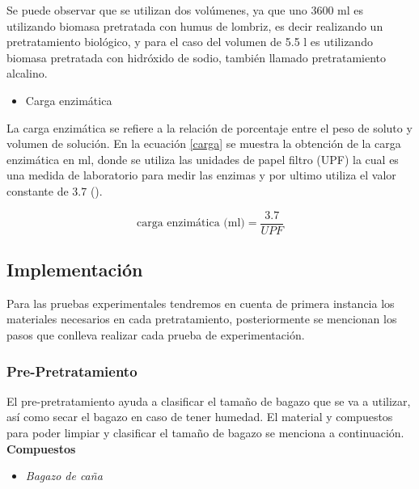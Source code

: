 \documentclass[12pt]{article}
\begin{document}
		
		Se puede observar que se utilizan dos volúmenes, ya que uno 3600 ml es utilizando biomasa pretratada con humus de lombriz, es decir realizando un pretratamiento biológico, y para el caso del volumen de 5.5 l es utilizando biomasa pretratada con hidróxido de sodio, también llamado pretratamiento alcalino.
		
		
			\begin{itemize}
			\item  Carga enzimática
	     	\end{itemize}
		
		
	La carga enzimática se refiere a la relación de porcentaje entre el peso de soluto y volumen de solución. En la ecuación \ref{carga} se muestra la obtención de la carga enzimática en ml, donde se utiliza las unidades de papel filtro (UPF) la cual es una medida de laboratorio para medir las enzimas y por ultimo utiliza el valor constante de 3.7 (\cite{Arturo2022evaluacion}).
			
	\begin{equation}
		\label{carga}
		\text{carga enzimática (ml)} = \frac{3.7}{UPF}
	\end{equation}
	

	
		

			
			
	
			\subsection{Implementación}

			Para las pruebas experimentales tendremos en cuenta de primera instancia los materiales necesarios en cada pretratamiento, posteriormente se mencionan los pasos que conlleva realizar cada prueba de experimentación.
			

			\subsubsection{Pre-Pretratamiento}

			
			El pre-pretratamiento ayuda a clasificar el tamaño de bagazo que se va a utilizar, así como secar el bagazo en caso de tener humedad. El material y compuestos para poder limpiar y clasificar el tamaño de bagazo se menciona a continuación.
			\\[0.5em]
			\textbf{Compuestos} 
			\begin{itemize}[label=\textcolor{blue}{$\bullet$}]
			 \item	\textit{ Bagazo de caña }
			\end{itemize} 
			
\end{document}
